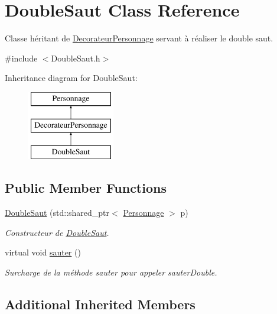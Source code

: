 \hypertarget{classDoubleSaut}{\section{Double\-Saut Class Reference}
\label{classDoubleSaut}
}


Classe héritant de \hyperlink{classDecorateurPersonnage}{Decorateur\-Personnage} servant à réaliser le double saut.  




{\ttfamily \#include $<$Double\-Saut.\-h$>$}

Inheritance diagram for Double\-Saut\-:\begin{figure}[H]
\begin{center}
\leavevmode
\includegraphics[height=3.000000cm]{classDoubleSaut}
\end{center}
\end{figure}
\subsection*{Public Member Functions}
\begin{DoxyCompactItemize}
\item 
\hyperlink{classDoubleSaut_a4f7b870530b28695f0ba4e494bd3136a}{Double\-Saut} (std\-::shared\-\_\-ptr$<$ \hyperlink{classPersonnage}{Personnage} $>$ p)
\begin{DoxyCompactList}\small\item\em Constructeur de \hyperlink{classDoubleSaut}{Double\-Saut}. \end{DoxyCompactList}\item 
\hypertarget{classDoubleSaut_a15569ae5b57ed3457ffda1630895c882}{virtual void \hyperlink{classDoubleSaut_a15569ae5b57ed3457ffda1630895c882}{sauter} ()}\label{classDoubleSaut_a15569ae5b57ed3457ffda1630895c882}

\begin{DoxyCompactList}\small\item\em Surcharge de la méthode sauter pour appeler sauter\-Double. \end{DoxyCompactList}\end{DoxyCompactItemize}
\subsection*{Additional Inherited Members}


